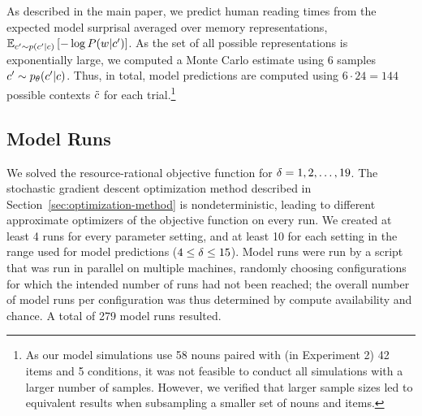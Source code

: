 As described in the main paper, we predict human reading times from the expected model surprisal averaged over memory representations, $\mathbb{E}_{c' \sim p(c'|c)} \left[- \log P(w|c')\right]$. As the set of all possible representations is exponentially large, we computed a Monte Carlo estimate using 6 samples $c' \sim p_\theta(c'|c)$.
Thus, in total, model predictions are computed using $6\cdot 24 = 144$ possible contexts ${\tilde {c}}$ for each trial.\footnote{As our model simulations use 58 nouns paired with (in Experiment 2) 42 items and 5 conditions, it was not feasible to conduct all simulations with a larger number of samples. However, we verified that larger sample sizes led to equivalent results when subsampling a smaller set of nouns and items.}


\subsection{Model Runs}
We solved the resource-rational objective function for $\delta = 1, 2, \dots, 19$.
The stochastic gradient descent optimization method described in Section~\ref{sec:optimization-method} is nondeterministic, leading to different approximate optimizers of the objective function on every run.
We created at least 4 runs for every parameter setting, and at least 10 for each setting in the range used for model predictions ($4\leq \delta \leq 15$).
Model runs were run by a script that was run in parallel on multiple machines, randomly choosing configurations for which the intended number of runs had not been reached; the overall number of model runs per configuration was thus determined by compute availability and chance.
A total of 279 model runs resulted.


